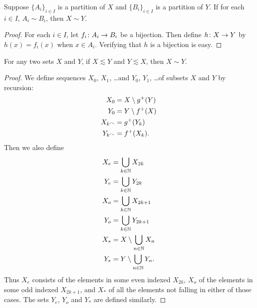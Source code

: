 \begin{lemma}
	Suppose $\{A_i\}_{i\in I}$ is a partition of $X$ and $\{B_i\}_{i\in I}$ is a partition of $Y$. If for each $i\in I$, $A_i\sim B_i$, then $X\sim Y$.
	\begin{proof}
		For each $i\in I$, let ${f_i}\colon{A_i}\to{B_i}$ be a bijection. Then define ${h}\colon{X}\to{Y}$ by $h(x) = f_i(x)$ when $x\in A_i$. Verifying that $h$ is a bijection is easy.
	\end{proof}
\end{lemma}

\begin{theorem}\label{thm:cantor-bernstein}
 For any two sets $X$ and $Y$, if $X\lesssim Y$ and $Y\lesssim X$, then $X\sim Y$. 
 
 \begin{proof}
 	We define sequences $X_0$, $X_1$, \ldots and $Y_0$, $Y_1$, \ldots of subsets $X$ and $Y$ by recursion:
 	\begin{align*}
 		X_0 &= X\setminus g^+(Y)\\
 		Y_0 &= Y\setminus f^+(X)\\
 		X_{k^\curvearrowright} &= g^+(Y_k)\\ 
 		Y_{k^\curvearrowright} &= f^+(X_k).
 	\end{align*}
 	Then we also define 
 	\begin{align*}
	 	X_e &= \bigcup_{k\in\mathbb N}X_{2k}\\
	 	Y_e &= \bigcup_{k\in\mathbb N}Y_{2k}\\
	 	X_o &= \bigcup_{k\in\mathbb N}X_{2k+1}\\
	 	Y_o &= \bigcup_{k\in\mathbb N}Y_{2k+1}\\
	 	X_* &= X\setminus\bigcup_{n\in\mathbb N}X_n\\
	 	Y_* &= Y\setminus \bigcup_{n\in\mathbb N}Y_n.
 	\end{align*}
 	Thus $X_e$ consists of the elements in some even indexed $X_{2k}$, $X_o$ of the elements in some odd indexed $X_{2k+1}$, and $X_*$ of all the elements not falling in either of those cases. The sets $Y_e$, $Y_o$ and $Y_*$ are defined similarly. 
 	

\end{proof}
\end{theorem}

